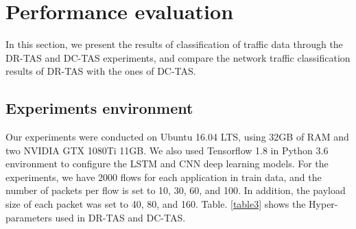 \documentclass[10pt, twoside, jounal]{IEEEtran}
\begin{document}
\section{Performance evaluation}
In this section, we present the results of classification of traffic data through the DR-TAS and DC-TAS experiments, and compare the network traffic classification results of DR-TAS with the ones of DC-TAS.

\subsection{Experiments environment}
Our experiments were conducted on Ubuntu 16.04 LTS, using 32GB of RAM and two NVIDIA GTX 1080Ti 11GB.
We also used Tensorflow 1.8 in Python 3.6 environment to configure the LSTM and CNN deep learning models.
For the experiments, we have 2000 flows for each application in train data, and the number of packets per flow is set
to 10, 30, 60, and 100.
In addition, the payload size of each packet was set to 40, 80, and 160.
Table. \ref{table3} shows the Hyper-parameters used in DR-TAS and DC-TAS.
\end{document}
